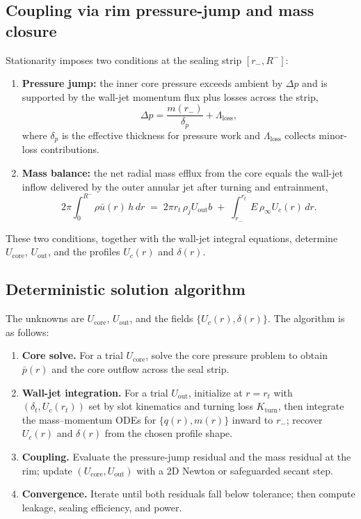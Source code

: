 \documentclass[11pt,a4paper]{article}
\begin{document}
\subsection{Coupling via rim pressure-jump and mass closure}\label{sec:coupling}
Stationarity imposes two conditions at the sealing strip $[r_-,R^{-}]$:
\begin{enumerate}
  \item \textbf{Pressure jump:} the inner core pressure exceeds ambient by $\Delta p$ and is supported by the wall-jet momentum flux plus losses across the strip,
  \begin{equation}
    \Delta p = \frac{m(r_-)}{\delta_p} + \Lambda_{\mathrm{loss}} ,
  \end{equation}
  where $\delta_p$ is the effective thickness for pressure work and $\Lambda_{\mathrm{loss}}$ collects minor-loss contributions.
  \item \textbf{Mass balance:} the net radial mass efflux from the core equals the wall-jet inflow delivered by the outer annular jet after turning and entrainment,
  \begin{equation}
    2\pi\!\int_0^{R^{-}}\!\rho \bar u(r)\,h\,dr \;=\; 2\pi r_t\,\rho_j U_{\mathrm{out}} b\;+\;\int_{r_-}^{r_t}\! E\,\rho_\infty U_c(r)\,dr .
  \end{equation}
\end{enumerate}
These two conditions, together with the wall-jet integral equations, determine $U_{\mathrm{core}}$, $U_{\mathrm{out}}$, and the profiles $U_c(r)$ and $\delta(r)$.

\subsection{Deterministic solution algorithm}
The unknowns are $U_{\mathrm{core}}$, $U_{\mathrm{out}}$, and the fields $\{U_c(r),\delta(r)\}$. The algorithm is as follows:
\begin{enumerate}
  \item \textbf{Core solve.} For a trial $U_{\mathrm{core}}$, solve the core pressure problem to obtain $\bar p(r)$ and the core outflow across the seal strip.
  \item \textbf{Wall-jet integration.} For a trial $U_{\mathrm{out}}$, initialize at $r=r_t$ with $(\delta_t, U_c(r_t))$ set by slot kinematics and turning loss $K_{\mathrm{turn}}$, then integrate the mass--momentum ODEs for $\{q(r),m(r)\}$ inward to $r_-$; recover $U_c(r)$ and $\delta(r)$ from the chosen profile shape.
  \item \textbf{Coupling.} Evaluate the pressure-jump residual and the mass residual at the rim; update $(U_{\mathrm{core}},U_{\mathrm{out}})$ with a 2D Newton or safeguarded secant step.
  \item \textbf{Convergence.} Iterate until both residuals fall below tolerance; then compute leakage, sealing efficiency, and power.
\end{enumerate}
\end{document}
